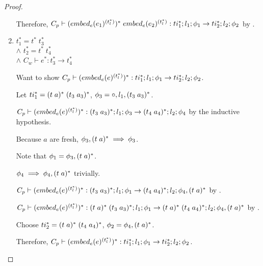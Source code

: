 \begin{proof}
\begin{enumerate}

        Therefore, $C_p \vdash (\embed[e]{e_1}^{(t_l^{*})})^{*}\; \embed[e]{e_2}^{(t_l^{*})} : ti_1^{*};l_1;\phi_1 \rightarrow ti_2^{*};l_2;\phi_2$ by .

        \item $t_1^{*} = t^{*}\; t_3^{*}$
        \\ $\land$ $t_2^{*} = t^{*}\; t_4^{*}$
        \\ $\land$ $C_w \vdash e^{*} : t_3^{*} \rightarrow t_4^{*}$

        Want to show $C_p \vdash (\embed[e]{e}^{(t_l^{*})})^{*} : ti_1^{*};l_1;\phi_1 \rightarrow ti_2^{*};l_2;\phi_2$.

        Let $ti_1^{*} = \ti{t}{a}^{*}\; \ti{t_3}{a_3}^{*}$, $\phi_3 = \circ,l_1,\ti{t_3}{a_3}^{*}$.

        $C_p \vdash (\embed[e]{e}^{(t_l^{*})})^{*} : \ti{t_3}{a_3}^{*};l_1;\phi_3 \rightarrow \ti{t_4}{a_4}^{*};l_2;\phi_4$ by the inductive hypothesis.

        Because $a$ are fresh, $\phi_3,\ti{t}{a}^{*} \implies \phi_3$.

        Note that $\phi_1 = \phi_3,\ti{t}{a}^{*}$.


        $\phi_4 \implies \phi_4,\ti{t}{a}^{*}$ trivially.

        $C_p \vdash (\embed[e]{e}^{(t_l^{*})})^{*} : \ti{t_3}{a_3}^{*};l_1;\phi_1 \rightarrow \ti{t_4}{a_4}^{*};l_2;\phi_4,\ti{t}{a}^{*}$ by .

        $C_p \vdash (\embed[e]{e}^{(t_l^{*})})^{*} : \ti{t}{a}^{*}\; \ti{t_3}{a_3}^{*};l_1;\phi_1 \rightarrow \ti{t}{a}^{*}\; \ti{t_4}{a_4}^{*};l_2;\phi_4,\ti{t}{a}^{*}$ by .

        Choose $ti_2^{*} = \ti{t}{a}^{*}\; \ti{t_4}{a_4}^{*}$, $\phi_2 = \phi_4,\ti{t}{a}^{*}$.

        Therefore, $C_p \vdash (\embed[e]{e}^{(t_l^{*})})^{*} : ti_1^{*};l_1;\phi_1 \rightarrow ti_2^{*};l_2;\phi_2$.

    \end{enumerate}
\end{proof}

